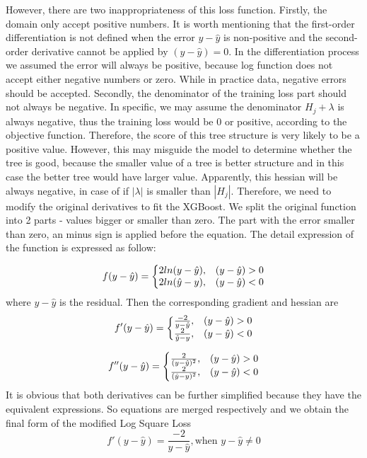 \documentclass[runningheads]{llncs}
\begin{document}
However, there are two inappropriateness of this loss function. Firstly, the domain only accept positive numbers. It is worth mentioning that the first-order differentiation is not defined when the error $y-\hat{y}$ is non-positive and the second-order derivative cannot be applied by $(y-\hat{y}) = 0$. In the differentiation process we assumed the error will always be positive, because log function does not accept either negative numbers or zero. While in practice data, negative errors should be accepted. Secondly, the denominator of the training loss part should not always be negative. In specific, we may assume the denominator $H_j + \lambda$ is always negative, thus the training loss would be 0 or positive, according to the objective function. Therefore, the score of this tree structure is very likely to be a positive value. However, this may misguide the model to determine whether the tree is good, because the smaller value of a tree is better structure and in this case the better tree would have larger value. Apparently, this hessian will be always negative, in case of if $|\lambda|$ is smaller than $|H_j|$. Therefore, we need to modify the original derivatives to fit the XGBoost. We split the original function into 2 parts - values bigger or smaller than zero. The part with the error smaller than zero, an minus sign is applied before the equation. The detail expression of the function is expressed as follow:

\begin{equation}
  f(y - \hat{y})=\left\{
  \begin{array}{@{}ll@{}}
    2ln(y - \hat{y}), & (y - \hat{y}) > 0 \\
    2ln(\hat{y} - y), & (y - \hat{y}) < 0
  \end{array}\right.
\end{equation}
where $y - \hat{y}$ is the residual. Then the corresponding gradient and hessian are
\begin{equation}
  f'(y - \hat{y})=\left\{
  \begin{array}{@{}ll@{}}
    \frac{-2}{y - \hat{y}}, & (y - \hat{y}) > 0 \\
    \frac{2}{\hat{y} - y} , & (y - \hat{y}) < 0
  \end{array}\right.
\end{equation}

\begin{equation}
  f''(y - \hat{y})=\left\{
  \begin{array}{@{}ll@{}}
    \frac{2}{(y - \hat{y})^2}, & (y - \hat{y}) > 0 \\
    \frac{2}{(\hat{y} - y)^2} , & (y - \hat{y}) < 0
  \end{array}\right.
\end{equation}
It is obvious that both derivatives can be further simplified because they have the equivalent expressions. So equations are merged respectively and we obtain the final form of the modified Log Square Loss
\begin{equation}
  f'(y - \hat{y})= \frac{-2}{y-\hat{y}}, \text{when } y-\hat{y} \neq 0
\end{equation}
\end{document}
